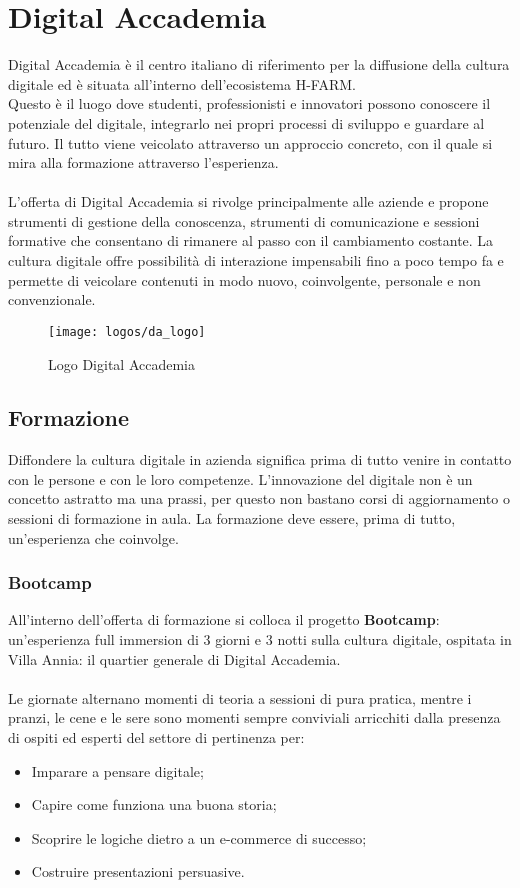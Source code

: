 \section{Digital Accademia}
Digital Accademia è il centro italiano di riferimento per la diffusione della cultura digitale ed è  situata all'interno dell'ecosistema H-FARM. \\
Questo è il luogo dove studenti, professionisti e innovatori possono conoscere il potenziale del digitale, integrarlo nei propri processi di sviluppo e guardare al futuro. Il tutto viene veicolato attraverso un approccio concreto, con il quale si mira alla formazione attraverso l'esperienza.
\\ \\
L'offerta di Digital Accademia si rivolge principalmente alle aziende e propone strumenti di gestione della conoscenza, strumenti di comunicazione e sessioni formative che consentano di rimanere al passo con il cambiamento costante. La cultura digitale offre possibilità di interazione impensabili fino a poco tempo fa e permette di veicolare contenuti in modo nuovo, coinvolgente, personale e non convenzionale.

\begin{figure}[htbp]
\begin{center}
\texttt{[image: logos/da\_logo]}
\caption{Logo Digital Accademia}
\end{center}
\end{figure}

\subsection{Formazione}
Diffondere la cultura digitale in azienda significa prima di tutto venire in contatto con le persone e con le loro competenze. L'innovazione del digitale non è un concetto astratto
ma una prassi, per questo non bastano corsi di aggiornamento o sessioni di formazione in aula. 
La formazione deve essere, prima di tutto, un'esperienza che coinvolge. 

\subsubsection{Bootcamp}
All'interno dell'offerta di formazione si colloca il progetto \textbf{Bootcamp}: un'esperienza full immersion di 3 giorni e 3 notti sulla cultura digitale, ospitata in Villa Annia: il quartier generale di Digital Accademia.
\\ \\
Le giornate alternano momenti di teoria a sessioni di pura pratica, mentre i pranzi, le cene e le sere sono momenti sempre conviviali arricchiti dalla presenza di ospiti ed esperti del settore di pertinenza per: 
\begin{itemize}
\item Imparare a pensare digitale;
\item Capire come funziona una buona storia;
\item Scoprire le logiche dietro a un e-commerce di successo; 
\item Costruire presentazioni persuasive.
\end{itemize}

